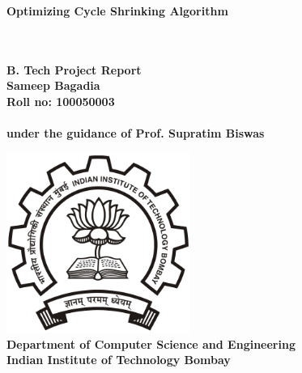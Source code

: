 \begin{titlepage}
\begin{center}

{\Huge \bfseries
Optimizing Cycle Shrinking Algorithm\\
}~\\[1cm]


{\large

}~\\[0.20cm]

{\Large \bfseries
B. Tech Project Report
}\\[2.75cm]

{\Large \bfseries
Sameep Bagadia\\
Roll no: 100050003\\

~\\
under the guidance of Prof. Supratim Biswas
}~\\[1cm]

\vfill

\includegraphics[width=6cm]{Figures/logo.png}~\\[1cm]

{\large \bfseries
Department of Computer Science and Engineering\\
Indian Institute of Technology Bombay\\
}

\end{center}
\end{titlepage}